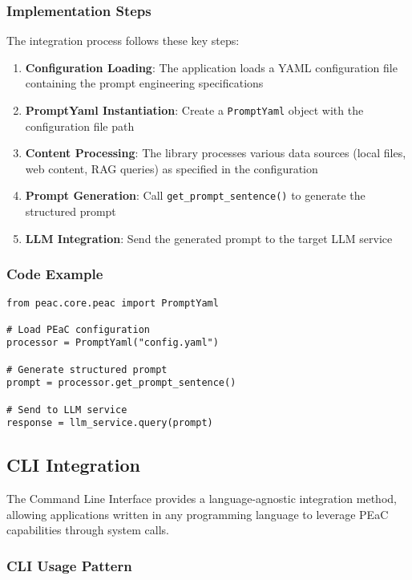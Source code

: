 \subsubsection{Implementation Steps}

The integration process follows these key steps:

\begin{enumerate}
    \item \textbf{Configuration Loading}: The application loads a YAML configuration file containing the prompt engineering specifications
    \item \textbf{PromptYaml Instantiation}: Create a \texttt{PromptYaml} object with the configuration file path
    \item \textbf{Content Processing}: The library processes various data sources (local files, web content, RAG queries) as specified in the configuration
    \item \textbf{Prompt Generation}: Call \texttt{get\_prompt\_sentence()} to generate the structured prompt
    \item \textbf{LLM Integration}: Send the generated prompt to the target LLM service
\end{enumerate}

\subsubsection{Code Example}

\begin{verbatim}
from peac.core.peac import PromptYaml

# Load PEaC configuration
processor = PromptYaml("config.yaml")

# Generate structured prompt
prompt = processor.get_prompt_sentence()

# Send to LLM service
response = llm_service.query(prompt)
\end{verbatim}

\subsection{CLI Integration}

The Command Line Interface provides a language-agnostic integration method, allowing applications written in any programming language to leverage PEaC capabilities through system calls.

\subsubsection{CLI Usage Pattern}

